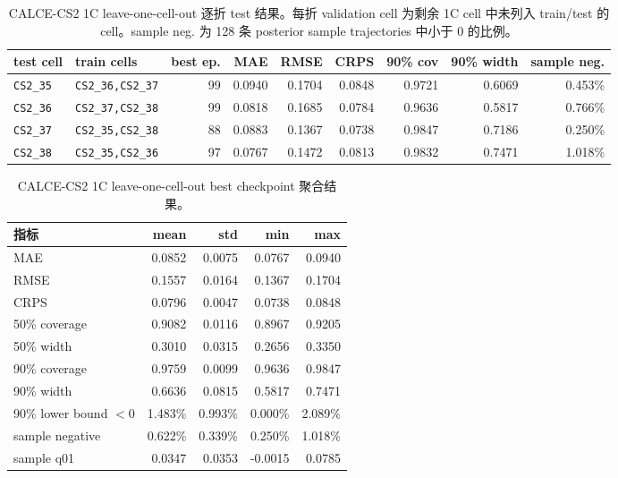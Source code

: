 \documentclass[11pt,a4paper,fontset=none]{ctexart}
\begin{document}
\begin{table}[h]
\centering
\scriptsize
\begin{tabular}{llrrrrrrr}
\toprule
test cell & train cells & best ep. & MAE & RMSE & CRPS & 90\% cov & 90\% width & sample neg. \\
\midrule
\texttt{CS2\_35} & \texttt{CS2\_36,CS2\_37} & 99 & 0.0940 & 0.1704 & 0.0848 & 0.9721 & 0.6069 & 0.453\% \\
\texttt{CS2\_36} & \texttt{CS2\_37,CS2\_38} & 99 & 0.0818 & 0.1685 & 0.0784 & 0.9636 & 0.5817 & 0.766\% \\
\texttt{CS2\_37} & \texttt{CS2\_35,CS2\_38} & 88 & 0.0883 & 0.1367 & 0.0738 & 0.9847 & 0.7186 & 0.250\% \\
\texttt{CS2\_38} & \texttt{CS2\_35,CS2\_36} & 97 & 0.0767 & 0.1472 & 0.0813 & 0.9832 & 0.7471 & 1.018\% \\
\bottomrule
\end{tabular}
\caption{CALCE-CS2 1C leave-one-cell-out 逐折 test 结果。每折 validation cell
为剩余 1C cell 中未列入 train/test 的 cell。sample neg. 为 128 条 posterior
sample trajectories 中小于 0 的比例。}
\label{tab:calce_1c_loo_folds}
\end{table}

\begin{table}[h]
\centering
\small
\begin{tabular}{lrrrr}
\toprule
指标 & mean & std & min & max \\
\midrule
MAE & 0.0852 & 0.0075 & 0.0767 & 0.0940 \\
RMSE & 0.1557 & 0.0164 & 0.1367 & 0.1704 \\
CRPS & 0.0796 & 0.0047 & 0.0738 & 0.0848 \\
50\% coverage & 0.9082 & 0.0116 & 0.8967 & 0.9205 \\
50\% width & 0.3010 & 0.0315 & 0.2656 & 0.3350 \\
90\% coverage & 0.9759 & 0.0099 & 0.9636 & 0.9847 \\
90\% width & 0.6636 & 0.0815 & 0.5817 & 0.7471 \\
90\% lower bound $<0$ & 1.483\% & 0.993\% & 0.000\% & 2.089\% \\
sample negative & 0.622\% & 0.339\% & 0.250\% & 1.018\% \\
sample q01 & 0.0347 & 0.0353 & -0.0015 & 0.0785 \\
\bottomrule
\end{tabular}
\caption{CALCE-CS2 1C leave-one-cell-out best checkpoint 聚合结果。}
\label{tab:calce_1c_loo_aggregate}
\end{table}
\end{document}
